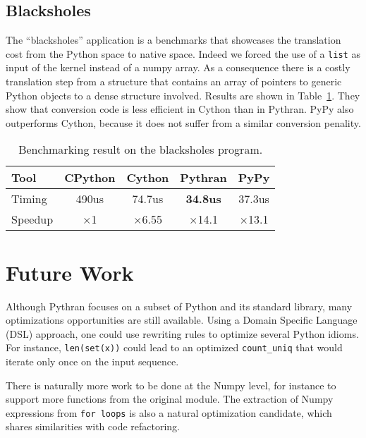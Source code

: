 \documentclass[10pt, onecolumn, preprint]{sigplanconf}
\begin{document}
\subsection{Blacksholes}

The ``blacksholes'' application is a benchmarks that showcases the
translation cost from the Python space to native space. Indeed we forced the
use of a \texttt{list} as input of the kernel instead of a numpy array. As a
consequence there is a costly translation step from a structure that contains
an array of pointers to generic Python objects to a dense structure involved.
Results are shown in Table~\ref{tbl:black}. They show that conversion code is
less efficient in Cython than in Pythran. PyPy also outperforms Cython, because
it does not suffer from a similar conversion penality.

\begin{table}
    \centering

    \begin{tabular}{|l|c|c|c|c|}
        \hline
     Tool    &  CPython    &   Cython     &     Pythran   &  PyPy \\
    \hline
    Timing  &  490us   &   74.7us     &    \textbf{34.8us} &  37.3us  \\
    \hline
    Speedup &  $\times$1         &    $\times$6.55      &    $\times$14.1   &  $\times$13.1    \\
    \hline
\end{tabular}
\caption{Benchmarking result on the blacksholes program.}
\label{tbl:black}

\end{table}

\section{Future Work}

Although Pythran focuses on a subset of Python and its standard library, many
optimizations opportunities are still available. Using a Domain Specific
Language (DSL) approach, one could use rewriting rules to optimize several
Python idioms. For instance, \texttt{len(set(x))} could lead to an optimized
\texttt{count\_uniq} that would iterate only once on the input sequence.

There is naturally more work to be done at the Numpy level, for instance to
support more functions from the original module. The extraction of Numpy
expressions from \texttt{for loops} is also a natural optimization candidate, which
shares similarities with code refactoring.
\end{document}
